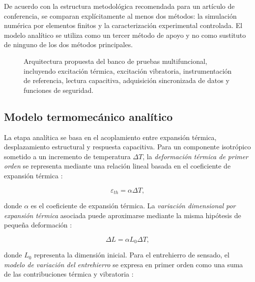 \documentclass[conference]{IEEEtran}
\begin{document}
De acuerdo con la estructura metodológica recomendada para un artículo de conferencia, se comparan explícitamente al menos dos métodos: la simulación numérica por elementos finitos y la caracterización experimental controlada. El modelo analítico se utiliza como un tercer método de apoyo y no como sustituto de ninguno de los dos métodos principales.


\begin{figure}[t]
\centering
{}
\caption{Arquitectura propuesta del banco de pruebas multifuncional, incluyendo excitación térmica, excitación vibratoria, instrumentación de referencia, lectura capacitiva, adquisición sincronizada de datos y funciones de seguridad.}
\label{fig:bench_architecture}
\end{figure}

\subsection{Modelo termomecánico analítico}

La etapa analítica se basa en el acoplamiento entre expansión térmica, desplazamiento estructural y respuesta capacitiva. Para un componente isotrópico sometido a un incremento de temperatura $\Delta T$, la \textit{deformación térmica de primer orden} se representa mediante una relación lineal basada en el coeficiente de expansión térmica \cite{Hao2012}:

\begin{equation}
\varepsilon_{th}=\alpha\Delta T,
\label{eq:thermal_strain}
\end{equation}

donde $\alpha$ es el coeficiente de expansión térmica. La \textit{variación dimensional por expansión térmica} asociada puede aproximarse mediante la misma hipótesis de pequeña deformación \cite{Hao2012}:

\begin{equation}
\Delta L=\alpha L_0\Delta T,
\label{eq:thermal_length}
\end{equation}

donde $L_0$ representa la dimensión inicial. Para el entrehierro de sensado, el \textit{modelo de variación del entrehierro} se expresa en primer orden como una suma de las contribuciones térmica y vibratoria \cite{Hao2012,Zhang2024}:
\end{document}
